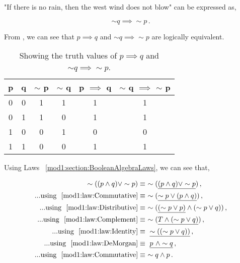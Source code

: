 \begin{subquestions}
\begin{subsubquestions}
\begin{subsubsubquestions}
"If there is no rain, then the west wind does not blow" can be expressed as,

\begin{equation}
	\sim q \implies \sim p\,.
\end{equation}

\end{subsubsubquestions}

\subsubquestion

From , we can see that $p \implies q$ and $\sim q \implies \sim p$ are logically equivalent.

\begin{table}[ht]
	\centering
	\begin{tabular}{|c|c|c|c|c|c|}
		\hline
		p & q & $\sim$ p & $\sim$ q & p $\implies$ q & $\sim$ q $\implies$ $\sim$ p \\
		\hline
		0 & 0 & 1 & 1 & 1 & 1 \\
	    0 & 1 & 1 & 0 & 1 & 1 \\
	    1 & 0 & 0 & 1 & 0 & 0 \\
	    1 & 1 & 0 & 0 & 1 & 1 \\
	    \hline
	\end{tabular}
	\caption{\label{2011:q1:tab:TruthTab2} Showing the truth values of  $p \implies q$ and $\sim q \implies \sim p$.}
\end{table}

\end{subsubquestions}


\subquestion

Using Laws ~\ref{mod1:section:BooleanAlgebraLaws}, we can see that,

\begin{align}	
	\sim((p \land q) \lor \sim p) 
	& \equiv ~ \sim(\underline{(p \land q) \lor \sim p}) \,, \nonumber \\
	...\text{using ~\ref{mod1:law:Commutative}}	
	& \equiv ~ \sim(\underline{\sim p \lor (p \land q)}) \,, \nonumber \\
	...\text{using ~\ref{mod1:law:Distributive}}
	& \equiv ~ \sim(\underline{(\sim p \lor p)} \land (\sim p \lor q)) \,, \nonumber \\
	...\text{using ~\ref{mod1:law:Complement}}
	& \equiv ~ \sim(\underline{T \land (\sim p \lor q)}) \,, \nonumber \\
	...\text{using ~\ref{mod1:law:Identity}}
	& \equiv ~ \underline{\sim((\sim p \lor q))} \,, \nonumber \\
	...\text{using ~\ref{mod1:law:DeMorgan}}
	& \equiv ~ \underline{ p ~\land \sim q} \,,  \nonumber \\
	...\text{using ~\ref{mod1:law:Commutative}}	
	& \equiv ~ \sim q \land p \,.
\end{align}

\end{subquestions}



